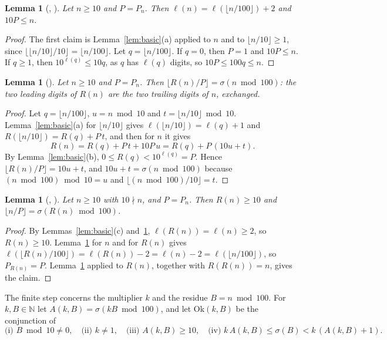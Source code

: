 \documentclass[11pt]{amsart}
\theoremstyle{plain}
\newtheorem{lemma}[theorem]{Lemma}
\theoremstyle{definition}
\newcommand{\N}{\mathbb{N}}
\newcommand{\sw}{\sigma}
\newcommand{\len}{\ell}
\begin{document}
\begin{lemma}[, ]\label{lem:len}
Let $n\ge10$ and $P=P_n$. Then $\len(n)=\len(\lfloor n/100\rfloor)+2$ and $10P\le n$.
\end{lemma}

\begin{proof}
The first claim is Lemma~\ref{lem:basic}(a) applied to $n$ and to $\lfloor n/10\rfloor\ge1$, since $\lfloor\lfloor n/10\rfloor/10\rfloor=\lfloor n/100\rfloor$. Let $q=\lfloor n/100\rfloor$. If $q=0$, then $P=1$ and $10P\le n$. If $q\ge1$, then $10^{\len(q)}\le10q$, as $q$ has $\len(q)$ digits, so $10P\le100q\le n$.
\end{proof}

\begin{lemma}[]\label{lem:Rlead}
Let $n\ge10$ and $P=P_n$. Then $\lfloor R(n)/P\rfloor=\sw(n\bmod100)$: the two leading digits of $R(n)$ are the two trailing digits of $n$, exchanged.
\end{lemma}

\begin{proof}
Let $q=\lfloor n/100\rfloor$, $u=n\bmod10$ and $t=\lfloor n/10\rfloor\bmod10$. Lemma~\ref{lem:basic}(a) for $\lfloor n/10\rfloor$ gives $\len(\lfloor n/10\rfloor)=\len(q)+1$ and $R(\lfloor n/10\rfloor)=R(q)+P\,t$, and then for $n$ it gives
\[
  R(n)=R(q)+P\,t+10P\,u=R(q)+P\,(10u+t).
\]
By Lemma~\ref{lem:basic}(b), $0\le R(q)<10^{\len(q)}=P$. Hence $\lfloor R(n)/P\rfloor=10u+t$, and $10u+t=\sw(n\bmod100)$ because $(n\bmod100)\bmod10=u$ and $\lfloor(n\bmod100)/10\rfloor=t$.
\end{proof}

\begin{lemma}[, ]\label{lem:nlead}
Let $n\ge10$ with $10\nmid n$, and $P=P_n$. Then $R(n)\ge10$ and $\lfloor n/P\rfloor=\sw(R(n)\bmod100)$.
\end{lemma}

\begin{proof}
By Lemmas~\ref{lem:basic}(c) and~\ref{lem:len}, $\len(R(n))=\len(n)\ge2$, so $R(n)\ge10$. Lemma~\ref{lem:len} for $n$ and for $R(n)$ gives $\len(\lfloor R(n)/100\rfloor)=\len(R(n))-2=\len(n)-2=\len(\lfloor n/100\rfloor)$, so $P_{R(n)}=P$. Lemma~\ref{lem:Rlead} applied to $R(n)$, together with $R(R(n))=n$, gives the claim.
\end{proof}

The finite step concerns the multiplier $k$ and the residue $B=n\bmod100$. For $k,B\in\N$ let $A(k,B)=\sw(kB\bmod100)$, and let $\mathrm{Ok}(k,B)$ be the conjunction of
\[
  \text{(i) } B\bmod10\ne0,\quad
  \text{(ii) } k\ne1,\quad
  \text{(iii) } A(k,B)\ge10,\quad
  \text{(iv) } k\,A(k,B)\le\sw(B)<k\,(A(k,B)+1).
\]
\end{document}

